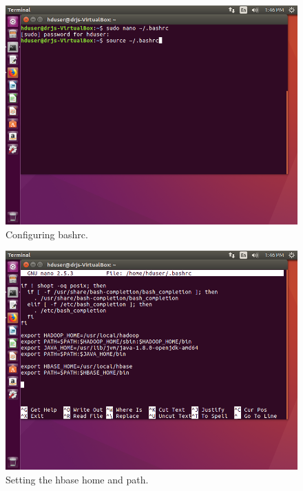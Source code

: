 \documentclass[a4paper,10pt]{article}
\begin{document}
\begin{figure}[h]
	\includegraphics[scale=0.33,center]{4.png}
	\caption{Configuring bashrc.}
	\label{fig:1}
\end{figure}

\begin{figure}[h]
	\includegraphics[scale=0.33,center]{5.png}
	\caption{Setting the hbase home and path.}
	\label{fig:1}
\end{figure}
\end{document}
